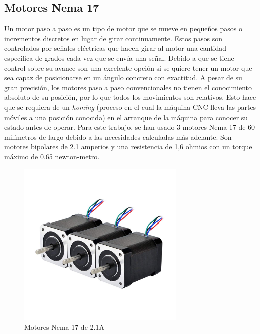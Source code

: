 \subsection{Motores Nema 17}
\label{subsec:motores}
Un motor paso a paso es un tipo de motor que se mueve en pequeños pasos o incrementos discretos en lugar de girar continuamente. Estos pasos 
son controlados por señales eléctricas que hacen girar al motor una cantidad específica de grados cada vez que se envía una señal. Debido a que se tiene 
control sobre su avance son una excelente opción si se quiere tener un motor que sea capaz de posicionarse en un ángulo concreto con exactitud. A pesar
de su gran precisión, los motores paso a paso convencionales no tienen el conocimiento absoluto de su posición, por lo que todos los movimientos son 
relativos. Esto hace que se requiera de un \textit{homing} (proceso en el cual la máquina CNC lleva las partes móviles a una 
posición conocida) en el arranque de la máquina para conocer su estado antes de operar.
Para este trabajo, se han usado 3 motores Nema 17 de 60 milímetros de largo debido a las necesidades calculadas más adelante. Son motores bipolares de 
2.1 amperios y una resistencia de 1,6 ohmios con un torque máximo de 0.65 newton-metro.
\begin{figure} [h!]
    \begin{center}
      \includegraphics[width=8cm]{figs/nema17.jpg}
    \end{center}
    \caption{Motores Nema 17 de 2.1A}
    \label{fig:robSoldering}
  \end{figure}\ 

